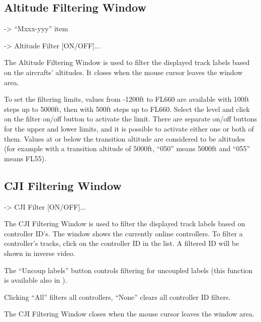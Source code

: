 \documentclass[a4paper,oneside,11pt]{memoir}
\begin{document}
\subsection{Altitude Filtering Window}
\label{win:afw}

 -> “Mxxx-yyy” item 

 -> Altitude Filter [ON/OFF]...

\bigskip

The Altitude Filtering Window is used to filter the displayed track labels based on the aircrafts’ altitudes. It closes when the mouse cursor leaves the window area.


To set the filtering limits, values from -1200ft to FL660 are available with 100ft steps up to 5000ft, then with 500ft steps up to FL660. Select the level and click on the filter on/off button to activate the limit. There are separate on/off buttons for the upper and lower limits, and it is possible to activate either one or both of them. Values at or below the transition altitude are considered to be altitudes (for example with a transition altitude of 5000ft, “050” means 5000ft and “055” means FL55).

\subsection{CJI Filtering Window}
\label{win:cji}

 -> CJI Filter [ON/OFF]...

\bigskip


The CJI Filtering Window is used to filter the displayed track labels based on controller ID’s. The window shows the currently online controllers. To filter a controller’s tracks, click on the controller ID in the list. A filtered ID will be shown in inverse video.

\bigskip

The “Uncoup labels” button controls filtering for uncoupled labels (this function is available also in ).

\bigskip

Clicking “All” filters all controllers, “None” clears all controller ID filters.

\bigskip

The CJI Filtering Window closes when the mouse cursor leaves the window area.
\end{document}
